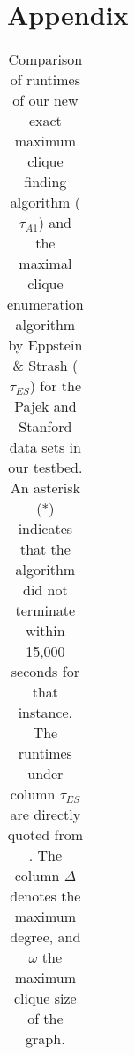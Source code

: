 \section*{Appendix}
\label{sec:appendix}

\begin{table}[!hbt]
\centering
\caption{Comparison of runtimes of our new exact maximum clique finding algorithm ($\tau_{A1}$) and the maximal clique enumeration algorithm by Eppstein \& Strash \cite{sea} ($\tau_{ES}$) for the Pajek and Stanford data sets in our testbed. An asterisk (*) indicates that the algorithm did not terminate within 
15,000 seconds for that instance. The runtimes under column $\tau_{ES}$ are directly quoted from \cite{sea}.
The column $\Delta$ denotes the maximum degree, and $\omega$ the maximum clique size of the graph.}
\label{tab:pajek_stanford-es}
\begin{tabular}{lrrrr|rr}
\toprule\toprule

\end{tabular}
\end{table}
